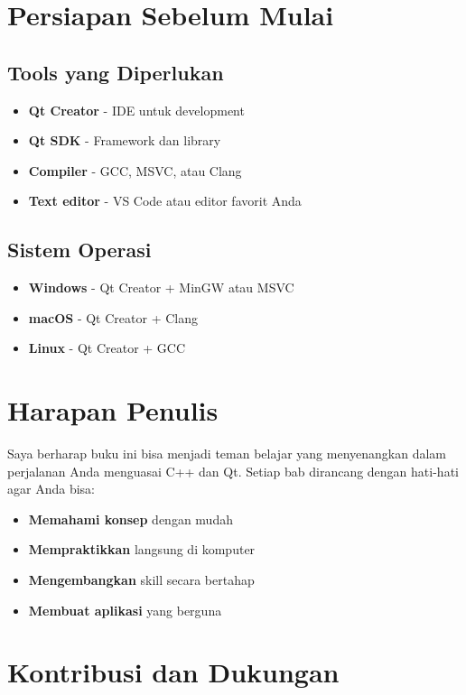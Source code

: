 \section*{Persiapan Sebelum Mulai}

\subsection*{Tools yang Diperlukan}
\begin{itemize}
\item \textbf{Qt Creator} - IDE untuk development
\item \textbf{Qt SDK} - Framework dan library
\item \textbf{Compiler} - GCC, MSVC, atau Clang
\item \textbf{Text editor} - VS Code atau editor favorit Anda
\end{itemize}

\subsection*{Sistem Operasi}
\begin{itemize}
\item \textbf{Windows} - Qt Creator + MinGW atau MSVC
\item \textbf{macOS} - Qt Creator + Clang
\item \textbf{Linux} - Qt Creator + GCC
\end{itemize}

\section*{Harapan Penulis}

Saya berharap buku ini bisa menjadi teman belajar yang menyenangkan dalam perjalanan Anda menguasai C++ dan Qt. Setiap bab dirancang dengan hati-hati agar Anda bisa:

\begin{itemize}
\item \textbf{Memahami konsep} dengan mudah
\item \textbf{Mempraktikkan} langsung di komputer
\item \textbf{Mengembangkan} skill secara bertahap
\item \textbf{Membuat aplikasi} yang berguna
\end{itemize}

\section*{Kontribusi dan Dukungan}

